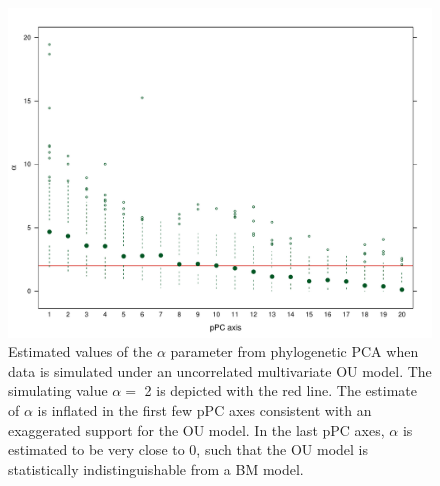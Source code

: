 \documentclass[12pt,twoside]{article}
\begin{document}
\begin{figure}[p]
\centering
\includegraphics[scale=0.65]{fig/alpha-est-uncor.pdf}
\caption[Estimates of the $\alpha$ parameter from phylogenetic PCA on uncorrelated OU]{Estimated values of the $\alpha$ parameter from phylogenetic PCA when data is simulated under an uncorrelated multivariate OU model. The simulating value $\alpha=$ 2 is depicted with the red line. The estimate of $\alpha$ is inflated in the first few pPC axes consistent with an exaggerated support for the OU model. In the last pPC axes, $\alpha$ is estimated to be very close to 0, such that the OU model is statistically indistinguishable from a BM model.}
\label{alpha-uncor}
\end{figure}
\end{document}
